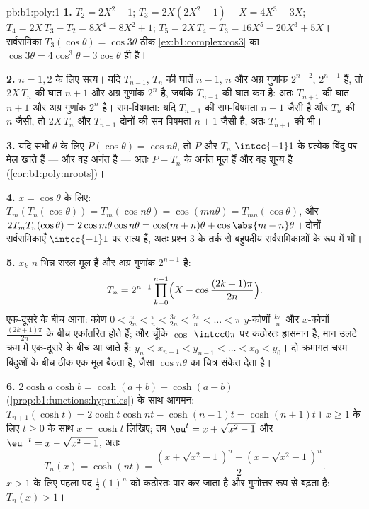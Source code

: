 \begin{solution}{pb:b1:poly:1}
\textbf{1.} $T_2 = 2X^2 - 1$; $T_3 = 2X(2X^2 - 1) - X = 4X^3 - 3X$; $T_4 =
2X\,T_3 - T_2 = 8X^4 - 8X^2 + 1$; $T_5 = 2X\,T_4 - T_3 = 16X^5 - 20X^3 +
5X$। सर्वसमिका $T_3(\cos\theta) = \cos3\theta$ ठीक \cref{ex:b1:complex:cos3}
का $\cos3\theta = 4\cos^3\theta - 3\cos\theta$ ही है।

\textbf{2.} $n = 1, 2$ के लिए सत्य। यदि $T_{n-1}$, $T_n$ की घातें $n-1$, $n$
और अग्र गुणांक $2^{n-2}$, $2^{n-1}$ हैं, तो $2X\,T_n$ की घात $n+1$ और अग्र
गुणांक $2^n$ है, जबकि $T_{n-1}$ की घात कम है: अतः $T_{n+1}$ की घात $n + 1$
और अग्र गुणांक $2^n$ है। सम-विषमता: यदि $T_{n-1}$ की सम-विषमता $n - 1$ जैसी
है और $T_n$ की $n$ जैसी, तो $2X\,T_n$ और $T_{n-1}$ दोनों की सम-विषमता $n +
1$ जैसी है, अतः $T_{n+1}$ की भी।

\textbf{3.} यदि सभी $\theta$ के लिए $P(\cos\theta) = \cos n\theta$, तो $P$
और $T_n$ $\intcc{-1}1$ के प्रत्येक बिंदु पर मेल खाते हैं --- और वह अनंत
 है --- अतः $P - T_n$ के अनंत मूल हैं और वह शून्य  है
(\cref{cor:b1:poly:nroots})।

\textbf{4.} $x = \cos\theta$ के लिए: $T_m(T_n(\cos\theta)) = T_m(\cos
n\theta) = \cos(mn\theta) = T_{mn}(\cos\theta)$, और $2T_mT_n(\cos\theta) =
2\cos m\theta\cos n\theta = \cos(m+n)\theta + \cos\abs{m - n}\theta$। दोनों
सर्वसमिकाएँ $\intcc{-1}1$ पर सत्य हैं, अतः प्रश्न 3 के तर्क से बहुपदीय
सर्वसमिकाओं के रूप में भी।

\textbf{5.} $x_k$ $n$ भिन्न सरल मूल हैं और अग्र गुणांक $2^{n-1}$ है:
\[
T_n = 2^{n-1}\prod_{k=0}^{n-1}
\Bigl(X - \cos\frac{(2k+1)\pi}{2n}\Bigr) .
\]
एक-दूसरे के बीच आना: कोण $0 < \frac{\pi}{2n} < \frac\pi n < \frac{3\pi}{2n}
< \frac{2\pi}n < \dots < \pi$ $y$-कोणों $\frac{k\pi}n$ और $x$-कोणों
$\frac{(2k+1)\pi}{2n}$ के बीच एकांतरित होते हैं; और चूँकि $\cos$
$\intcc0\pi$ पर कठोरतः ह्रासमान है, मान उलटे क्रम में एक-दूसरे के बीच आ जाते
हैं: $y_n < x_{n-1} < y_{n-1} < \dots < x_0 < y_0$। दो क्रमागत चरम बिंदुओं
के बीच ठीक एक मूल बैठता है, जैसा $\cos n\theta$ का चित्र संकेत देता है।

\textbf{6.} $2\cosh a\cosh b = \cosh(a + b) + \cosh(a - b)$
(\cref{prop:b1:functions:hyprules}) के साथ आगमन: $T_{n+1}(\cosh t) = 2\cosh
t\cosh nt - \cosh(n-1)t = \cosh(n+1)t$। $x \geq 1$ के लिए $t \geq 0$ के साथ
$x = \cosh t$ लिखिए; तब $\eu^t = x + \sqrt{x^2 - 1}$ और $\eu^{-t} = x -
\sqrt{x^2 - 1}$, अतः
\[
T_n(x) = \cosh(nt)
= \frac{(x + \sqrt{x^2-1})^n + (x - \sqrt{x^2-1})^n}2 .
\]
$x > 1$ के लिए पहला पद $\frac12(1)^n$ को कठोरतः पार कर जाता है और गुणोत्तर
रूप से बढ़ता है: $T_n(x) > 1$।


\end{solution}

